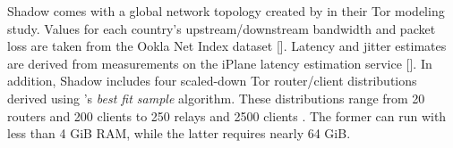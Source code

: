 Shadow comes with a global network topology created by \citet{methmodelnetwork} in their Tor modeling study. Values for each country's upstream/downstream bandwidth and packet loss are taken from the Ookla Net Index dataset [\citeauthor{ookla}]. Latency and jitter estimates are derived from measurements on the iPlane latency estimation service [\citeauthor{iplane}]. In addition, Shadow includes four scaled-down Tor router/client distributions derived using \citet{methmodelnetwork}'s \emph{best fit sample} algorithm. These distributions range from 20 routers and 200 clients to 250 relays and 2500 clients \citep{shadowwiki}. The former can run with less than 4 GiB RAM, while the latter requires nearly 64 GiB.
